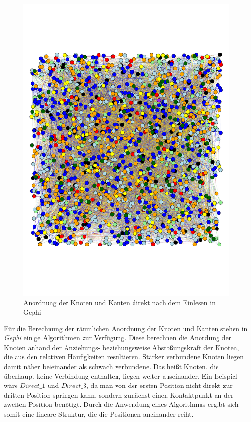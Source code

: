 \begin{figure}[H]
	\centering\includegraphics[scale=0.6]{graphbegin.pdf}\caption[Anordnung der Knoten nach dem Einlesen]{Anordnung der Knoten und Kanten direkt nach dem Einlesen in Gephi}\label{graphbegin}
\end{figure}
Für die Berechnung der räumlichen Anordnung der Knoten und Kanten stehen in \textit{Gephi} einige Algorithmen zur Verfügung. Diese berechnen die Anordung der Knoten anhand der Anziehungs- beziehungsweise Abstoßungskraft der Knoten, die aus den relativen Häufigkeiten resultieren. Stärker verbundene Knoten liegen damit näher beieinander als schwach verbundene. Das heißt Knoten, die überhaupt keine Verbindung enthalten, liegen weiter auseinander. Ein Beispiel wäre $Direct\_1$ und $Direct\_3$, da man von der ersten Position nicht direkt zur dritten Position springen kann, sondern zunächst einen Kontaktpunkt an der zweiten Position benötigt. Durch die Anwendung eines Algorithmus ergibt sich somit eine lineare Struktur, die die Positionen aneinander reiht.\\
